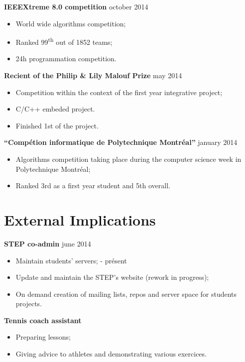 \documentclass[margin]{res}
\begin{document}
\begin{resume}
  {\bf IEEEXtreme 8.0 competition} \hfill october 2014
  \begin{itemize} \itemsep -2pt
  \item World wide algorithms competition;
  \item Ranked 99\textsuperscript{th} out of 1852 teams;
  \item 24h programmation competition.
  \end{itemize}
  
  {\bf Recient of the Philip \& Lily Malouf Prize} \hfill may 2014
  \begin{itemize} \itemsep -2pt
  \item Competition within the context of the first year integrative project;
  \item C/C++ embeded project.
  \item Finished 1st of the project.
  \end{itemize}
  
  {\bf ``Comp\'{e}tion informatique de Polytechnique Montr\'{e}al''} \hfill january 2014
  \begin{itemize} \itemsep -2pt
  \item Algorithms competition taking place during the computer science week in Polytechnique  Montr\'{e}al;
  \item Ranked 3rd as a first year student and 5th overall.
  \end{itemize}


  \section{External Implications}
  
  {\bf STEP co-admin} \hfill june 2014
  \begin{itemize} \itemsep -2pt
  \item Maintain students' servers; \hfill - pr\'esent
  \item Update and maintain the STEP's website (rework in progress);
  \item On demand creation of mailing lists, repos and server space for students projects.
  \end{itemize}
  
  {\bf Tennis coach assistant}
  \begin{itemize} \itemsep -2pt
  \item Preparing lessons;
  \item Giving advice to athletes and demonstrating various exercices.
  \end{itemize}
  

\end{resume}
\end{document}
